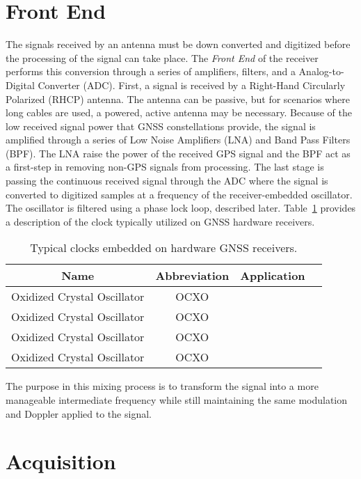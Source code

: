 \section{Front End}
The signals received by an antenna must be down converted and digitized before the processing of the signal can take place. The \textit{Front End} of the receiver performs this conversion through a series of amplifiers, filters, and a Analog-to-Digital Converter (ADC). First, a signal is received by a Right-Hand Circularly Polarized (RHCP) antenna. The antenna can be passive, but for scenarios where long cables are used, a powered, active antenna may be necessary. Because of the low received signal power that GNSS constellations provide, the signal is amplified through a series of Low Noise Amplifiers (LNA) and Band Pass Filters (BPF). The LNA raise the power of the received GPS signal and the BPF act as a first-step in removing non-GPS signals from processing. The last stage is passing the continuous received signal through the ADC where the signal is converted to digitized samples at a frequency of the receiver-embedded oscillator. The oscillator is filtered using a phase lock loop, described later. Table~\ref{tbl:clocks} provides a description of the clock typically utilized on GNSS hardware receivers.

\begin{table}[!ht]\label{tbl:clocks}
    \caption{Typical clocks embedded on hardware GNSS receivers.}
    \centering
    \begin{tabular}{cccc}
        \toprule
        Name & Abbreviation & Application \\
        \midrule
        Oxidized Crystal Oscillator & OCXO & \\
        Oxidized Crystal Oscillator & OCXO & \\
        Oxidized Crystal Oscillator & OCXO & \\
        Oxidized Crystal Oscillator & OCXO & \\
        \bottomrule
    \end{tabular}
\end{table}

The purpose in this mixing process is to transform the signal into a more manageable intermediate frequency while still maintaining the same modulation and Doppler applied to the signal.  

\section{Acquisition}

